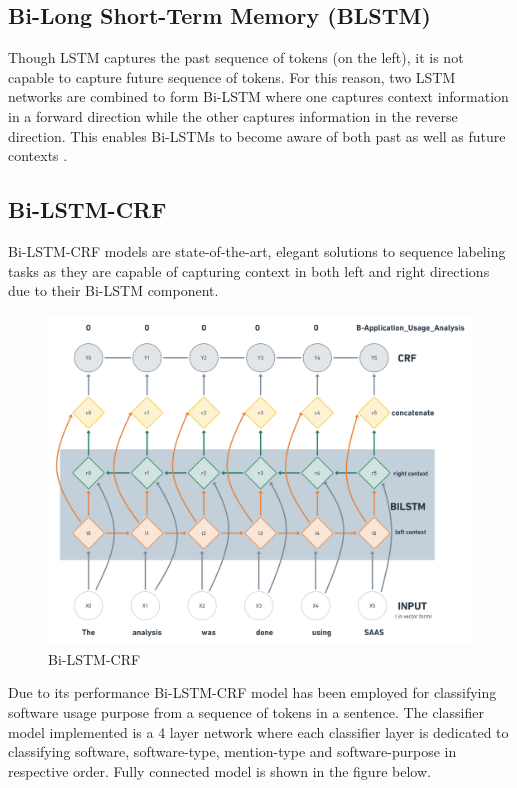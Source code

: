 \subsection{Bi-Long Short-Term Memory (BLSTM)}
\label{sec:chapter05:DLModels:BiLSTM}

Though LSTM captures the past sequence of tokens (on the left), it is not capable to capture future sequence of tokens. For this reason, two LSTM networks are combined to form Bi-LSTM where one captures context information in a forward direction while the other captures information in the reverse direction. This enables Bi-LSTMs to become aware of both past as well as future contexts \citep{ma2016end}. 

\subsection{Bi-LSTM-CRF}
\label{sec:chapter05:DLModels:BiLSTMCRF}

Bi-LSTM-CRF models are state-of-the-art, elegant solutions to sequence labeling tasks as they are capable of capturing context in both left and right directions due to their Bi-LSTM component. 

\begin{figure}[htbp]
	\centering
	\includegraphics[width=.7\textwidth]{4.graphics/figures/ch_5/Bi-LSTM-CRF}
	\caption{Bi-LSTM-CRF }
	\label{fig:chapter03:setup}
\end{figure}

Due to its performance Bi-LSTM-CRF model has been employed for classifying software usage purpose from a sequence of tokens in a sentence. The classifier model implemented is a 4 layer network where each classifier layer is dedicated to classifying software, software-type, mention-type and software-purpose in respective order. Fully connected model is shown in the figure below. 

